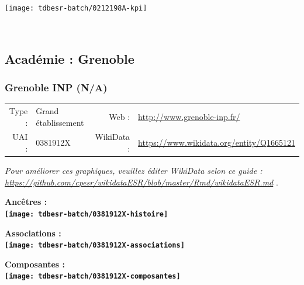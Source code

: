 \documentclass[12pt,french,]{article}
\begin{document}
\begin{center}\texttt{[image: tdbesr-batch/0212198A-kpi]} \end{center}\checkoddpage

\ifoddpage \fi ~\newpage  

\hypertarget{acaduxe9mie-grenoble-1}{%
\subsection{Académie : Grenoble}\label{acaduxe9mie-grenoble-1}}

\hypertarget{grenoble-inp-na}{%
\subsubsection{Grenoble INP (N/A)}\label{grenoble-inp-na}}

\begin{tabular*}{\textwidth}{rp{5cm}rl}  
\hline  
Type : & Grand établissement & Web : &\href{http://www.grenoble-inp.fr/}{http://www.grenoble-inp.fr/} \\  
UAI : & 0381912X & WikiData : & \href{https://www.wikidata.org/entity/Q1665121}{https://www.wikidata.org/entity/Q1665121} \\  
\hline  
\end{tabular*}

\textit{\scriptsize Pour améliorer ces graphiques, veuillez éditer WikiData selon ce guide :  \href{https://github.com/cpesr/wikidataESR/blob/master/Rmd/wikidataESR.md}{https://github.com/cpesr/wikidataESR/blob/master/Rmd/wikidataESR.md}}
.

\vspace{1cm}  
\begin{minipage}[b]{0.50\textwidth}\begin{center} \bf Ancêtres : \\  
\texttt{[image: tdbesr-batch/0381912X-histoire]} \end{center}\end{minipage}\begin{minipage}[b]{0.50\textwidth}\begin{center} \bf Associations : \\  
\texttt{[image: tdbesr-batch/0381912X-associations]} \end{center}\end{minipage}

\hrulefill

\begin{center} \bf Composantes : \\  
\texttt{[image: tdbesr-batch/0381912X-composantes]} \end{center}
\end{document}
